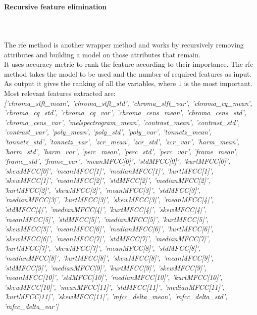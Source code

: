 \paragraph{Recursive feature elimination}
\mbox{} \\ \\
The \gls{rfe} method is another wrapper method and works by recursively removing attributes and building a model on those attributes that remain.
\\
It uses accuracy metric to rank the feature according to their importance. The \gls{rfe} method takes the model to be used and the number of required features as input. As output it gives the ranking of all the variables, where $1$ is the most important.
\\
Most relevant features extracted are:
\\ \linebreak 
\textit{['chroma\_stft\_mean', 'chroma\_stft\_std', 'chroma\_stft\_var', 'chroma\_cq\_mean', 'chroma\_cq\_std', 'chroma\_cq\_var', 'chroma\_cens\_mean', 'chroma\_cens\_std', 'chroma\_cens\_var', 'melspectrogram\_mean', 'contrast\_mean', 'contrast\_std', 'contrast\_var', 'poly\_mean', 'poly\_std', 'poly\_var', 'tonnetz\_mean', 'tonnetz\_std', 'tonnetz\_var', 'zcr\_mean', 'zcr\_std', 'zcr\_var', 'harm\_mean', 'harm\_std', 'harm\_var', 'perc\_mean', 'perc\_std', 'perc\_var', 'frame\_mean', 'frame\_std',  'frame\_var', 'meanMFCC[0]', 'stdMFCC[0]', 'kurtMFCC[0]', 'skewMFCC[0]', 'meanMFCC[1]', 'medianMFCC[1]', 'kurtMFCC[1]', 'skewMFCC[1]', 'meanMFCC[2]', 'stdMFCC[2]', 'medianMFCC[2]', 'kurtMFCC[2]', 'skewMFCC[2]', 'meanMFCC[3]', 'stdMFCC[3]', 'medianMFCC[3]', 'kurtMFCC[3]', 'skewMFCC[3]', 'meanMFCC[4]', 'stdMFCC[4]', 'medianMFCC[4]', 'kurtMFCC[4]', 'skewMFCC[4]', 'meanMFCC[5]', 'stdMFCC[5]', 'medianMFCC[5]', 'kurtMFCC[5]', 'skewMFCC[5]', 'meanMFCC[6]', 'medianMFCC[6]', 'kurtMFCC[6]', 'skewMFCC[6]', 'meanMFCC[7]', 'stdMFCC[7]', 'medianMFCC[7]', 'kurtMFCC[7]', 'skewMFCC[7]', 'meanMFCC[8]', 'stdMFCC[8]', 'medianMFCC[8]',  'kurtMFCC[8]', 'skewMFCC[8]', 'meanMFCC[9]', 'stdMFCC[9]', 'medianMFCC[9]', 'kurtMFCC[9]', 'skewMFCC[9]', 'meanMFCC[10]', 'stdMFCC[10]', 'medianMFCC[10]', 'kurtMFCC[10]', 'skewMFCC[10]', 'meanMFCC[11]', 'stdMFCC[11]', 'medianMFCC[11]', 'kurtMFCC[11]', 'skewMFCC[11]', 'mfcc\_delta\_mean', 'mfcc\_delta\_std', 'mfcc\_delta\_var']}

